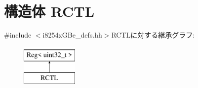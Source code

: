 \hypertarget{structiGbReg_1_1Regs_1_1RCTL}{
\section{構造体 RCTL}
\label{structiGbReg_1_1Regs_1_1RCTL}
}


{\ttfamily \#include $<$i8254xGBe\_\-defs.hh$>$}RCTLに対する継承グラフ:\begin{figure}[H]
\begin{center}
\leavevmode
\includegraphics[height=2cm]{structiGbReg_1_1Regs_1_1RCTL}
\end{center}
\end{figure}
